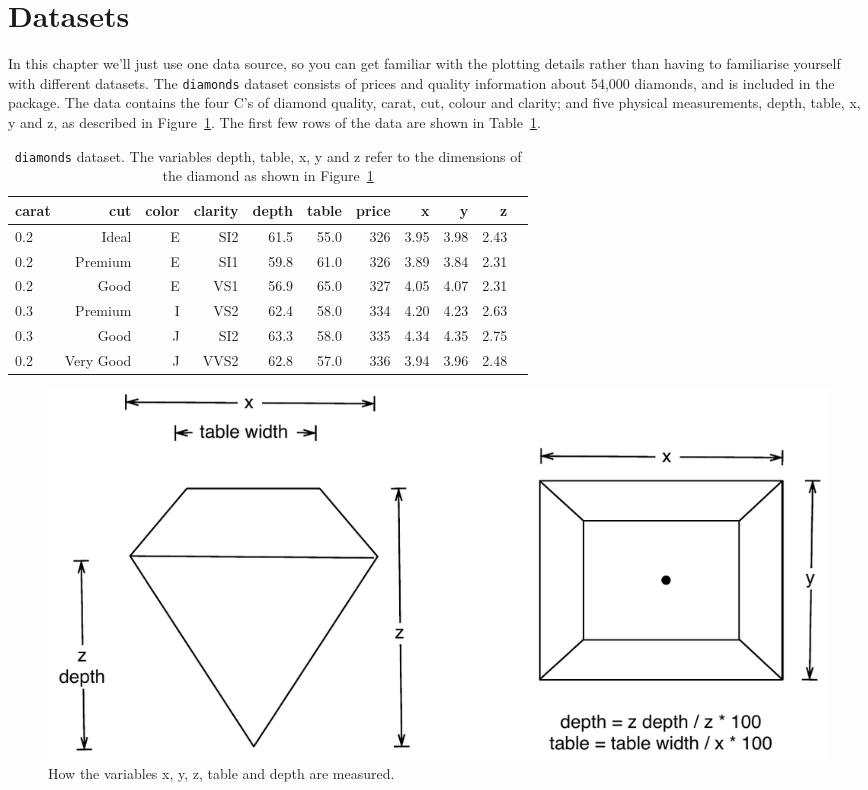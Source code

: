 \section{Datasets}\label{sec:data_sets}

In this chapter we'll just use one data source, so you can get familiar with the plotting details rather than having to familiarise yourself with different datasets. The {\tt diamonds} dataset consists of prices and quality information about 54,000 diamonds, and is included in the \ggplot package. The data contains the four C's of diamond quality, carat, cut, colour and clarity; and five physical measurements, depth, table, x, y and z, as described in Figure~\ref{fig:diamond-dim}.  The first few rows of the data are shown in Table~\ref{tab:diamonds}. 

\begin{table}[ht]
\begin{center}
\begin{tabular}{lrrrrrrrrrr}
  \toprule
  carat & cut & color & clarity & depth & table & price & x & y & z \\
  \midrule
  0.2 & Ideal & E & SI2 & 61.5 & 55.0 & 326 & 3.95 & 3.98 & 2.43 \\
  0.2 & Premium & E & SI1 & 59.8 & 61.0 & 326 & 3.89 & 3.84 & 2.31 \\
  0.2 & Good & E & VS1 & 56.9 & 65.0 & 327 & 4.05 & 4.07 & 2.31 \\
  0.3 & Premium & I & VS2 & 62.4 & 58.0 & 334 & 4.20 & 4.23 & 2.63 \\
  0.3 & Good & J & SI2 & 63.3 & 58.0 & 335 & 4.34 & 4.35 & 2.75 \\
  0.2 & Very Good & J & VVS2 & 62.8 & 57.0 & 336 & 3.94 & 3.96 & 2.48 \\
  \bottomrule
\end{tabular}
\caption{{\tt diamonds} dataset.  The variables depth, table, x, y and z refer to the dimensions of the diamond as shown in Figure~\ref{fig:diamond-dim}}
\label{tab:diamonds}
\end{center}
\end{table}

\begin{figure}[htbp]
  \centering
    \includegraphics[width=0.8\linewidth]{diamond-dimensions}
  \caption{How the variables x, y, z, table and depth are measured.}
  \label{fig:diamond-dim}
\end{figure}

